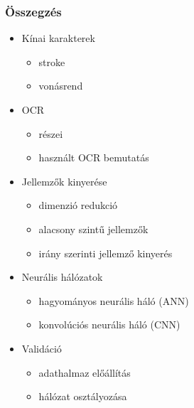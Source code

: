 \documentclass{beamer}
\begin{document}
\begin{frame}[fragile]
\frametitle{Összegzés}
\begin{itemize}
\item Kínai karakterek
	\begin{itemize}
	\item stroke
	\item vonásrend
	\end{itemize}
\item OCR
	\begin{itemize}
	\item részei
	\item használt OCR bemutatás
	\end{itemize}
\item Jellemzők kinyerése
	\begin{itemize}
	\item dimenzió redukció
	\item alacsony szintű jellemzők
	\item irány szerinti jellemző kinyerés
	\end{itemize}
\item Neurális hálózatok
	\begin{itemize}
	\item hagyományos neurális háló (ANN)
	\item konvolúciós neurális háló (CNN)
	\end{itemize}
\item Validáció
	\begin{itemize}
	\item adathalmaz előállítás
	\item hálózat osztályozása
	\end{itemize}
\end{itemize}

\end{frame}
\end{document}
